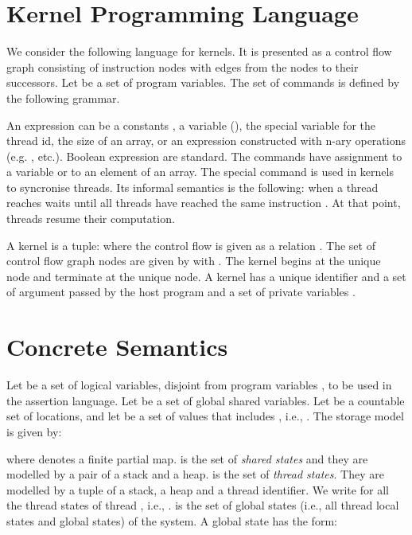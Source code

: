 \documentclass[a4paper,11pt]{llncs}
\newcounter{note_number}
\begin{document}
\section{Kernel Programming Language}
\label{sec:progr-language}
We consider the following language for kernels.
It is presented as a control flow
graph consisting of instruction nodes with edges from the nodes to their successors.
Let  be a set of program variables.
The set  of commands is defined by the following grammar.

An expression can be a constants , a variable  (), the special variable  for the thread id, the size of an array, or an expression constructed with n-ary operations (e.g. , etc.).
Boolean expression  are standard.
The commands have assignment to a variable or to an element of an array.
The special command  is used in kernels to syncronise threads.
Its informal semantics is the following: when a thread reaches  waits until all threads have reached the same instruction . At that point, threads resume their computation.\\

\newcommand{\Node}{\mathsf{CFGNode}}
\newcommand{\locals}{\mathit{Locals}}
\newcommand{\args}{\mathit{Args}}

\noindent
A kernel is a tuple: 
where the control flow is given as a relation . The set of control flow graph nodes are given by  with . The kernel begins at the
unique node  and terminate at the unique  node.
A kernel has a unique identifier  and a set of argument   passed by the host program and a set of private variables .



\section{Concrete Semantics}
\label{sec:concrete-semantics}
Let  be a set of logical
variables, disjoint from program variables , to be used in the
assertion language. Let  be a set of global shared variables. 
Let  be a countable set of
locations, and let  be a set of values that includes
, i.e., . The storage model is given by:

where  denotes a finite partial map. 
  is the set of  {\em shared states} and they   
  are modelled by a pair  of a stack and a heap.
 is the set of 
{\em thread states}. They are modelled by a tuple  of a stack, a heap and a thread
identifier. We write  for all the thread states of thread , i.e., .
 is the set of global states (i.e., all thread local states and global states) of the system. A global state has the form:
\end{document}
